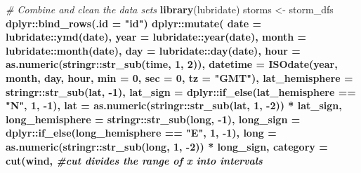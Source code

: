 \documentclass[]{book}
\newenvironment{Shaded}{\begin{snugshade}}{\end{snugshade}}
\newcommand{\CommentTok}[1]{\textcolor[rgb]{0.56,0.35,0.01}{\textit{#1}}}
\newcommand{\DataTypeTok}[1]{\textcolor[rgb]{0.13,0.29,0.53}{#1}}
\newcommand{\DecValTok}[1]{\textcolor[rgb]{0.00,0.00,0.81}{#1}}
\newcommand{\KeywordTok}[1]{\textcolor[rgb]{0.13,0.29,0.53}{\textbf{#1}}}
\newcommand{\NormalTok}[1]{#1}
\newcommand{\OperatorTok}[1]{\textcolor[rgb]{0.81,0.36,0.00}{\textbf{#1}}}
\newcommand{\StringTok}[1]{\textcolor[rgb]{0.31,0.60,0.02}{#1}}
\begin{document}
\begin{Shaded}
\begin{Highlighting}[]
\CommentTok{# Combine and clean the data sets}
\KeywordTok{library}\NormalTok{(lubridate)}
\NormalTok{storms <-}\StringTok{ }
\StringTok{  }\NormalTok{storm_dfs }\OperatorTok{%>%}
\StringTok{  }\NormalTok{dplyr}\OperatorTok{::}\KeywordTok{bind_rows}\NormalTok{(}\DataTypeTok{.id =} \StringTok{"id"}\NormalTok{) }\OperatorTok{%>%}
\StringTok{  }\NormalTok{dplyr}\OperatorTok{::}\KeywordTok{mutate}\NormalTok{(}
    \DataTypeTok{date =}\NormalTok{ lubridate}\OperatorTok{::}\KeywordTok{ymd}\NormalTok{(date),}
    \DataTypeTok{year =}\NormalTok{ lubridate}\OperatorTok{::}\KeywordTok{year}\NormalTok{(date),}
    \DataTypeTok{month =}\NormalTok{ lubridate}\OperatorTok{::}\KeywordTok{month}\NormalTok{(date),}
    \DataTypeTok{day =}\NormalTok{ lubridate}\OperatorTok{::}\KeywordTok{day}\NormalTok{(date),}
    \DataTypeTok{hour =} \KeywordTok{as.numeric}\NormalTok{(stringr}\OperatorTok{::}\KeywordTok{str_sub}\NormalTok{(time, }\DecValTok{1}\NormalTok{, }\DecValTok{2}\NormalTok{)),}
    \DataTypeTok{datetime =} \KeywordTok{ISOdate}\NormalTok{(year, month, day, hour, }\DataTypeTok{min =} \DecValTok{0}\NormalTok{, }\DataTypeTok{sec =} \DecValTok{0}\NormalTok{, }\DataTypeTok{tz =} \StringTok{"GMT"}\NormalTok{),}
    \DataTypeTok{lat_hemisphere =}\NormalTok{ stringr}\OperatorTok{::}\KeywordTok{str_sub}\NormalTok{(lat, }\DecValTok{-1}\NormalTok{),}
    \DataTypeTok{lat_sign =}\NormalTok{ dplyr}\OperatorTok{::}\KeywordTok{if_else}\NormalTok{(lat_hemisphere }\OperatorTok{==}\StringTok{ "N"}\NormalTok{, }\DecValTok{1}\NormalTok{, }\DecValTok{-1}\NormalTok{),}
    \DataTypeTok{lat =} \KeywordTok{as.numeric}\NormalTok{(stringr}\OperatorTok{::}\KeywordTok{str_sub}\NormalTok{(lat, }\DecValTok{1}\NormalTok{, }\DecValTok{-2}\NormalTok{)) }\OperatorTok{*}\StringTok{ }\NormalTok{lat_sign,}
    \DataTypeTok{long_hemisphere =}\NormalTok{ stringr}\OperatorTok{::}\KeywordTok{str_sub}\NormalTok{(long, }\DecValTok{-1}\NormalTok{),}
    \DataTypeTok{long_sign =}\NormalTok{ dplyr}\OperatorTok{::}\KeywordTok{if_else}\NormalTok{(long_hemisphere }\OperatorTok{==}\StringTok{ "E"}\NormalTok{, }\DecValTok{1}\NormalTok{, }\DecValTok{-1}\NormalTok{),}
    \DataTypeTok{long =} \KeywordTok{as.numeric}\NormalTok{(stringr}\OperatorTok{::}\KeywordTok{str_sub}\NormalTok{(long, }\DecValTok{1}\NormalTok{, }\DecValTok{-2}\NormalTok{)) }\OperatorTok{*}\StringTok{ }\NormalTok{long_sign,}
    \DataTypeTok{category =} \KeywordTok{cut}\NormalTok{(wind, }\CommentTok{#cut divides the range of x into intervals}
}}
\end{Highlighting}
\end{Shaded}
\end{document}
